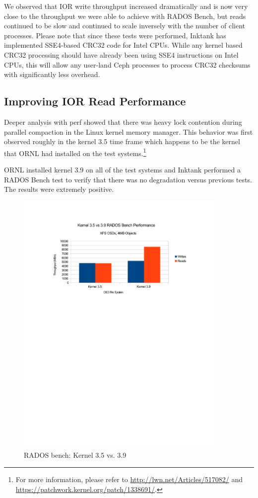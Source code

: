 \documentclass{article}
\begin{document}
We observed that IOR write throughput increased dramatically and is now very
close to the throughput we were able to achieve with RADOS Bench, but reads
continued to be slow and continued to scale inversely with the number of client
processes.  Please note that since these tests were performed, Inktank has
implemented SSE4-based CRC32 code for Intel CPUs.  While any kernel based CRC32
processing should have already been using SSE4 instructions on Intel CPUs, this
will allow any user-land Ceph processes to process CRC32 checksums with
significantly less overhead.

\subsection{Improving IOR Read Performance}

Deeper analysis with perf showed that there was heavy lock contention during
parallel compaction in the Linux kernel memory manager.  This behavior was first
observed roughly in the kernel 3.5 time frame which happens to be the kernel
that ORNL had installed on the test systems.\footnote{For more information,
please refer to \url{http://lwn.net/Articles/517082/} and
\url{https://patchwork.kernel.org/patch/1338691/}.}

ORNL installed kernel 3.9 on all of the test systems and Inktank performed a
RADOS Bench test to verify that there was no degradation versus previous tests.  The
results were extremely positive.


\begin{figure}[htb]
\centering
\includegraphics[width=4in]{rados-kernel-35vs39}
\caption{RADOS bench: Kernel 3.5 vs. 3.9}
\label{fig:rados-kernel}
\end{figure}
\end{document}
